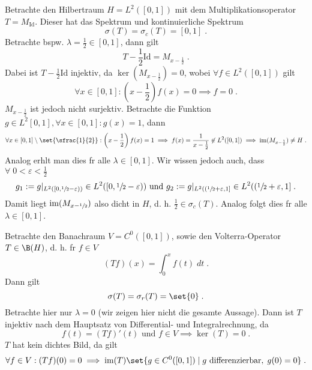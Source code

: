 \begin{ex}
	Betrachte den Hilbertraum \(H = L^2([0,1])\) mit dem Multiplikationsoperator \(T = M_\text{Id}\). Dieser hat das Spektrum und kontinuierliche Spektrum
	\[\sigma(T) =\sigma_c(T)= [0,1]\;.\] 
	Betrachte bspw. \(\lambda = \frac{1}{2} \in [0,1]\), dann gilt
	\[T - \frac{1}{2}\text{Id} = M_{x-\frac 12}\;.\]
	Dabei ist \(T-\frac{1}{2}\text{Id}\) injektiv, da \(\ker(M_{x-\frac 12}) = 0\), wobei \(\forall f\in L^2([0,1])\) gilt
	\[\forall x \in [0,1]: \left(x-\frac12\right)f(x) = 0 \implies f = 0\;.\]
	\(M_{x-\frac 12}\) ist jedoch nicht surjektiv. Betrachte die Funktion \(g\in L^2[0,1], \forall x \in [0,1]: g(x) = 1\), dann
	\[\forall x \in [0,1]\setminus\set{\sfrac{1}{2}}: \left(x-\frac 12\right) f(x) = 1 \implies f(x) = \frac{1}{x - \frac 12} \not\in L^2([0,1]) \implies \text{im}(M_{x-\frac12}) \neq H\;.\]
	Analog erh\as lt man dies f\us r alle \(\lambda \in [0,1]\). Wir wissen jedoch auch, dass \(\forall \;0< \varepsilon < \frac12\)
	\[g_1 := g\vert_{L^2([0,\sfrac 12 - \varepsilon))} \in L^2([0, \sfrac12 - \varepsilon)) \text{ und } g_2 := g\vert_{L^2((\sfrac 12 + \varepsilon,1]} \in L^2((\sfrac 12 + \varepsilon,1]\;.\]
	Damit liegt \(\text{im}(M_{x-\sfrac 12})\) also dicht in $H$, d. h. \(\frac 12 \in \sigma_c(T)\). Analog folgt dies f\us r alle \(\lambda  \in [0,1]\).
\end{ex}

\begin{ex}
	Betrachte den Banachraum \(V = C^0([0,1])\), sowie den Volterra-Operator \(T\in \B(H)\), d. h. f\us r \(f \in V\)
	\[(Tf)(x) = \int_0^x f(t) \;dt\;.\]
	Dann gilt 
	\[\sigma(T) = \sigma_r(T) = \set{0}\;.\]
	Betrachte hier nur \(\lambda = 0\) (wir zeigen hier nicht die gesamte Aussage). Dann ist $T$ injektiv nach dem Hauptsatz von Differential- und Integralrechnung, da 
	\[f(t) = (Tf)'(t) \text{ und } f \in V \implies \ker(T) = {0}\;.\]  
	$T$ hat kein dichtes Bild, da gilt
	\[\forall f \in V: (Tf)(0) = 0 \implies \text{im}(T) \set{g \in C^0([0,1])\;\vert\; g \text{ differenzierbar}, \;g(0) = 0} \;.\]
\end{ex}

